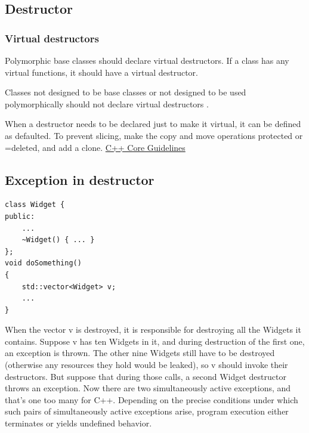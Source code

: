 \documentclass[a4paper,12pt,notitlepage]{article}
\begin{document}

\subsection{Destructor}


\subsubsection{Virtual destructors}

\noindent
Polymorphic base classes should declare virtual destructors. If a class has any virtual functions,
it should have a virtual destructor.

\noindent
Classes not designed to be base classes or not designed to be used polymorphically should not declare
virtual destructors \cite{Meyers_eff}.

\noindent
When a destructor needs to be declared just to make it virtual, it can be defined as defaulted. To
prevent slicing, make the copy and move operations protected or =deleted, and add a clone.
\href{https://isocpp.github.io/CppCoreGuidelines/CppCoreGuidelines#cdefop-default-operationsb}{C++ Core Guidelines}


\subsection{Exception in destructor}

\begin{verbatim}
class Widget {
public:
    ...
    ~Widget() { ... }
};
void doSomething()
{
    std::vector<Widget> v;
    ...
}
\end{verbatim}

When the vector v is destroyed, it is responsible for destroying all the Widgets it contains.
Suppose v has ten Widgets in it, and during destruction of the first one, an exception is thrown.
The other nine Widgets still have to be destroyed (otherwise any resources they hold would be
leaked), so v should invoke their destructors. But suppose that during those calls, a second Widget
destructor throws an exception. Now there are two simultaneously active exceptions, and that's one
too many for C++. Depending on the precise conditions under which such pairs of simultaneously
active exceptions arise, program execution either terminates or yields undefined behavior.
\end{document}
